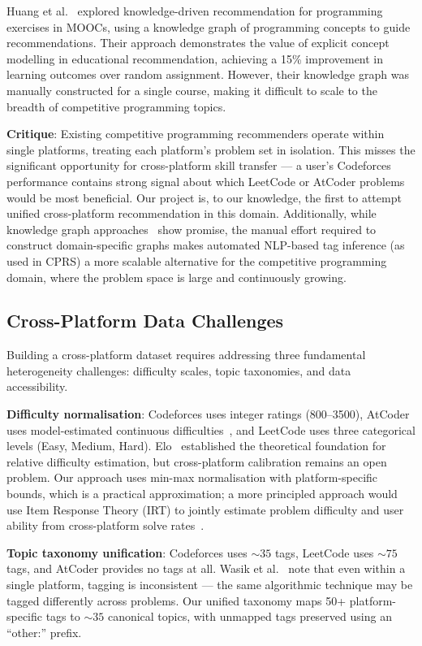 \documentclass[12pt,a4paper]{article}
\begin{document}
Huang et al.~\cite{huang2020} explored knowledge-driven recommendation for programming exercises in MOOCs, using a knowledge graph of programming concepts to guide recommendations. Their approach demonstrates the value of explicit concept modelling in educational recommendation, achieving a 15\% improvement in learning outcomes over random assignment. However, their knowledge graph was manually constructed for a single course, making it difficult to scale to the breadth of competitive programming topics.

\textbf{Critique}: Existing competitive programming recommenders operate within single platforms, treating each platform's problem set in isolation. This misses the significant opportunity for cross-platform skill transfer --- a user's Codeforces performance contains strong signal about which LeetCode or AtCoder problems would be most beneficial. Our project is, to our knowledge, the first to attempt unified cross-platform recommendation in this domain. Additionally, while knowledge graph approaches~\cite{huang2020} show promise, the manual effort required to construct domain-specific graphs makes automated NLP-based tag inference (as used in CPRS) a more scalable alternative for the competitive programming domain, where the problem space is large and continuously growing.

\subsection{Cross-Platform Data Challenges}

Building a cross-platform dataset requires addressing three fundamental heterogeneity challenges: difficulty scales, topic taxonomies, and data accessibility.

\textbf{Difficulty normalisation}: Codeforces uses integer ratings (800--3500), AtCoder uses model-estimated continuous difficulties~\cite{kenkoooo2024}, and LeetCode uses three categorical levels (Easy, Medium, Hard). Elo~\cite{elo1978} established the theoretical foundation for relative difficulty estimation, but cross-platform calibration remains an open problem. Our approach uses min-max normalisation with platform-specific bounds, which is a practical approximation; a more principled approach would use Item Response Theory (IRT) to jointly estimate problem difficulty and user ability from cross-platform solve rates~\cite{baker2001}.

\textbf{Topic taxonomy unification}: Codeforces uses ${\sim}35$ tags, LeetCode uses ${\sim}75$ tags, and AtCoder provides no tags at all. Wasik et al.~\cite{wasik2018} note that even within a single platform, tagging is inconsistent --- the same algorithmic technique may be tagged differently across problems. Our unified taxonomy maps 50+ platform-specific tags to ${\sim}35$ canonical topics, with unmapped tags preserved using an ``other:'' prefix.
\end{document}
